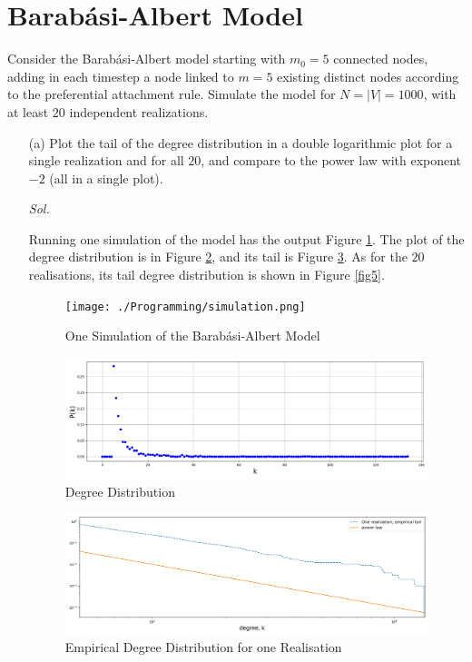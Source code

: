 \section{Barab\'{a}si-Albert Model}

Consider the Barab\'{a}si-Albert model starting with $m_0 = 5$ connected nodes, adding in each timestep a node linked to $m=5$ existing distinct nodes according to the preferential attachment rule. Simulate the model for $N = |V| = 1000$, with at least $20$ independent realizations. 

\begin{enumerate}
    \item[(a)] Plot the tail of the degree distribution in a double logarithmic plot for a single realization and for all $20$, and compare to the power law with exponent $-2$ (all in a single plot).
    
    \textit{ Sol. }
    
    Running one simulation of the model has the output Figure \ref{fig2}. The plot of the degree distribution is in Figure \ref{fig3}, and its tail is Figure \ref{fig4}. As for the $20$ realisations, its tail degree distribution is shown in Figure \ref{fig5}.
    \begin{figure}[!ht]
        \texttt{[image: ./Programming/simulation.png]}
        \caption{One Simulation of the Barab\'{a}si-Albert Model}
        \label{fig2}
    \end{figure}
    
    \begin{figure}[!ht]
        \includegraphics[width=18cm]{./Programming/degree-distribution.png}
        \caption{Degree Distribution}
        \label{fig3}
    \end{figure}

    \begin{figure}[!ht]
        \includegraphics[width=18cm]{./Programming/1-realisation.png}
        \caption{Empirical Degree Distribution for one Realisation}
        \label{fig4}
    \end{figure}


\end{enumerate}
